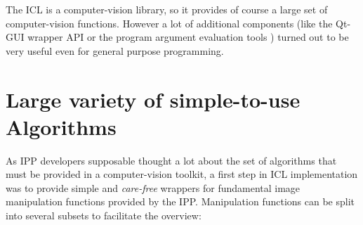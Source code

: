  The ICL is a computer-vision library, so it provides of course a large set of computer-vision functions. However a lot of additional components (like the Qt-GUI wrapper API  or the program argument evaluation tools ) turned out to be very useful even for general purpose programming. 

\section{Large variety of simple-to-use Algorithms}
As IPP developers supposable thought a lot about the set of algorithms that must be provided in a computer-vision toolkit, a first step in ICL implementation was to provide simple and \emph{care-free} wrappers for fundamental image manipulation functions provided by the IPP. Manipulation functions can be split into several subsets to facilitate the overview:
